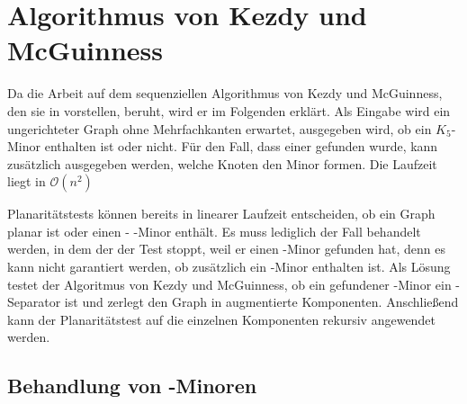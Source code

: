 \chapter{Algorithmus von Kezdy und McGuinness}
\label{cha:algorithmuskezdymcguinness}

Da die Arbeit auf dem sequenziellen Algorithmus von Kezdy und McGuinness, den sie in \cite{KeM92} vorstellen, beruht, wird er im Folgenden erklärt.
Als Eingabe wird ein ungerichteter Graph ohne Mehrfachkanten erwartet, ausgegeben wird, ob ein $K_5$-Minor enthalten ist oder nicht.
Für den Fall, dass einer gefunden wurde, kann zusätzlich ausgegeben werden, welche Knoten den Minor formen.
Die Laufzeit liegt in $\mathcal{O}(n^2)$

Planaritätstests können bereits in linearer Laufzeit entscheiden, ob ein Graph planar ist oder einen \kf- \bzw \kdd-Minor enthält.
Es muss lediglich der Fall behandelt werden, in dem der der Test stoppt, weil er einen \kdd-Minor gefunden hat, denn es kann nicht garantiert werden, ob zusätzlich ein \kf-Minor enthalten ist.
Als Lösung testet der Algoritmus von Kezdy und McGuinness, ob ein gefundener \kdd-Minor ein \dd-Separator ist und zerlegt \ggf den Graph in augmentierte Komponenten.
Anschließend kann der Planaritätstest auf die einzelnen Komponenten rekursiv angewendet werden.


\section{Behandlung von \kdd-Minoren}
\label{sec:behandlung_von_kdd_minoren}

